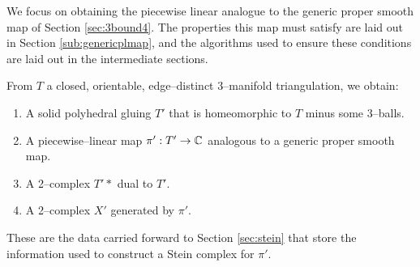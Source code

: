We focus on obtaining the piecewise linear analogue to the generic proper smooth map of Section \ref{sec:3bound4}.
The properties this map must satisfy are laid out in Section \ref{sub:genericplmap}, and the algorithms used to ensure these conditions are laid out in the intermediate sections.

From $T$ a closed, orientable, edge--distinct 3--manifold triangulation, we obtain:
\begin{enumerate}
	\item A solid polyhedral gluing $T'$ that is homeomorphic to $T$ minus some 3--balls.
	\item A piecewise--linear map $\pi':T'\to\mathbb{C}$ analogous to a generic proper smooth map.
	\item A 2--complex $T'*$ dual to $T'$.
	\item A 2--complex $X'$ generated by $\pi'$.
\end{enumerate}
These are the data carried forward to Section \ref{sec:stein} that store the information used to construct a Stein complex for $\pi'$.